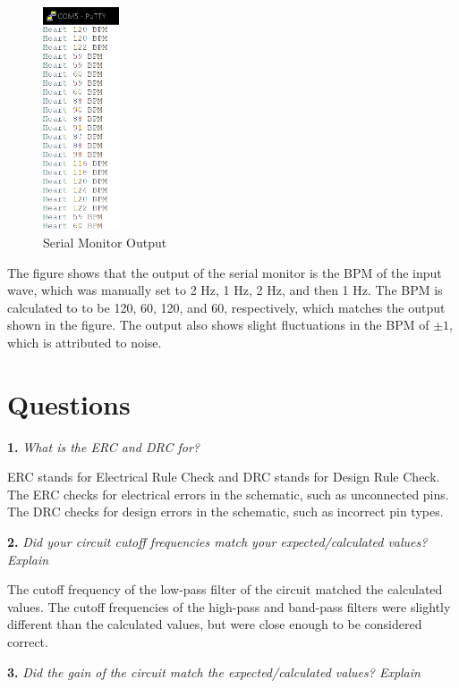 \documentclass[CMPE]{KGCOEReport}
\begin{document}
\begin{figure}[H]
    \centering
    \includegraphics[width=0.2\textwidth]{putty.png}
    \caption{Serial Monitor Output}
    \label{fig:serialMonitor}
\end{figure}

The figure shows that the output of the serial monitor is the BPM of the input wave, which was manually set to 2 Hz, 1 Hz, 2 Hz, and then 1 Hz. The BPM is calculated to to be 120, 60, 120, and 60, respectively, which matches the output shown in the figure. The output also shows slight fluctuations in the BPM of $\pm 1$, which is attributed to noise.

\section*{Questions}

\textbf{1.} \emph{What is the ERC and DRC for?}

ERC stands for Electrical Rule Check and DRC stands for Design Rule Check. The ERC checks for electrical errors in the schematic, such as unconnected pins. The DRC checks for design errors in the schematic, such as incorrect pin types.

\bigskip

\textbf{2.} \emph{Did your circuit cutoff frequencies match your expected/calculated values? Explain}

The cutoff frequency of the low-pass filter of the circuit matched the calculated values. The cutoff frequencies of the high-pass and band-pass filters were slightly different than the calculated values, but were close enough to be considered correct.

\bigskip

\textbf{3.} \emph{Did the gain of the circuit match the expected/calculated values? Explain}
\end{document}
